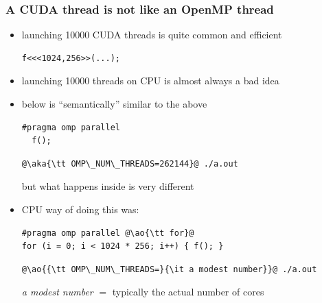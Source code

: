 \documentclass[12pt,dvipdfmx]{beamer}
\newcommand{\ao}[1]{{\color{blue}#1}}
\newcommand{\aka}[1]{{\color{red}#1}}
\begin{document}
\begin{frame}[fragile]
  \frametitle{A CUDA thread is not like an OpenMP thread}
  \begin{itemize}
  \item launching 10000 CUDA threads is quite common and efficient
\begin{lstlisting}
f<<<1024,256>>(...);      
\end{lstlisting}

\item launching 10000 threads on CPU is almost always a bad idea
\item below is ``semantically'' similar to the above  
\begin{lstlisting}
#pragma omp parallel
  f();
\end{lstlisting}
\begin{lstlisting}
@\aka{\tt OMP\_NUM\_THREADS=262144}@ ./a.out
\end{lstlisting}
but what happens inside is very different

\item CPU way of doing this was:
\begin{lstlisting}
#pragma omp parallel @\ao{\tt for}@
for (i = 0; i < 1024 * 256; i++) { f(); }
\end{lstlisting}
\begin{lstlisting}
@\ao{{\tt OMP\_NUM\_THREADS=}{\it a modest number}}@ ./a.out
\end{lstlisting}
{\it a modest number} $=$ typically the actual number of cores
\end{itemize}

\end{frame}
\end{document}
